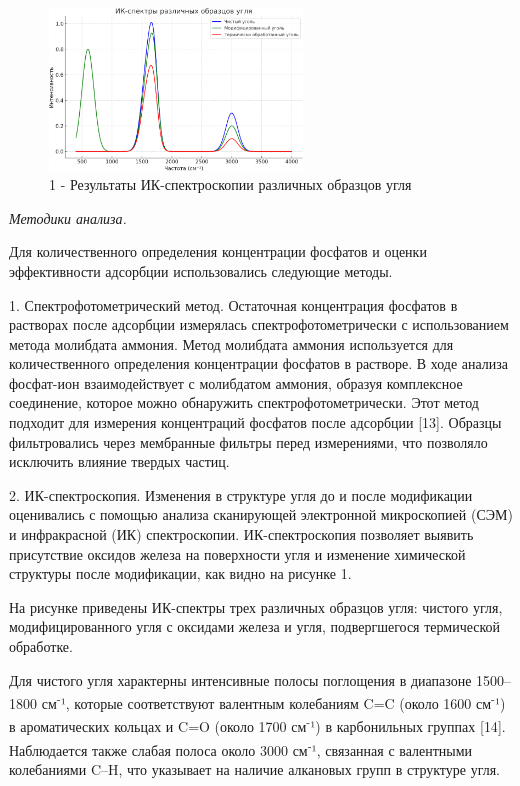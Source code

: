 \begin{figure}[H]
	\centering
	\includegraphics[width=0.6\textwidth]{media/chem/image8}
	\caption*{1 - Результаты ИК-спектроскопии различных образцов угля}
\end{figure}

\begin{multicols}{2}
\emph{Методики анализа.}

Для количественного определения концентрации фосфатов и оценки
эффективности адсорбции использовались следующие методы.

1. Спектрофотометрический метод. Остаточная концентрация фосфатов в
растворах после адсорбции измерялась спектрофотометрически с
использованием метода молибдата аммония. Метод молибдата аммония
используется для количественного определения концентрации фосфатов в
растворе. В ходе анализа фосфат-ион взаимодействует с молибдатом
аммония, образуя комплексное соединение, которое можно обнаружить
спектрофотометрически. Этот метод подходит для измерения концентраций
фосфатов после адсорбции {[}13{]}. Образцы фильтровались через
мембранные фильтры перед измерениями, что позволяло исключить влияние
твердых частиц.

2. ИК-спектроскопия. Изменения в структуре угля до и после модификации
оценивались с помощью анализа сканирующей электронной микроскопией (СЭМ)
и инфракрасной (ИК) спектроскопии. ИК-спектроскопия позволяет выявить
присутствие оксидов железа на поверхности угля и изменение химической
структуры после модификации, как видно на рисунке 1.

На рисунке приведены ИК-спектры трех различных образцов угля: чистого
угля, модифицированного угля с оксидами железа и угля, подвергшегося
термической обработке.

Для чистого угля характерны интенсивные полосы поглощения в диапазоне
1500--1800 см\textsuperscript{-}¹, которые соответствуют валентным
колебаниям C=C (около 1600 см\textsuperscript{-}¹) в ароматических
кольцах и C=O (около 1700 см\textsuperscript{-}¹) в карбонильных группах
{[}14{]}. Наблюдается также слабая полоса около 3000
см\textsuperscript{-}¹, связанная с валентными колебаниями C--H, что
указывает на наличие алкановых групп в структуре угля.


\end{multicols}
